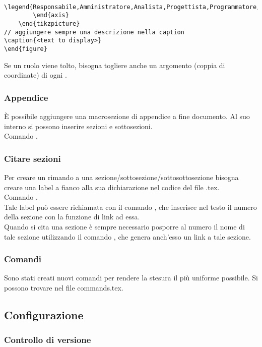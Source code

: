 \begin{itemize}
\begin{lstlisting}
			\legend{Responsabile,Amministratore,Analista,Progettista,Programmatore,Verificatore}
		\end{axis}
	\end{tikzpicture}
// aggiungere sempre una descrizione nella caption
\caption{<text to display>}
\end{figure}
		\end{lstlisting}
		Se un ruolo viene tolto, bisogna togliere anche un argomento (coppia di coordinate) di ogni .
	\end{itemize}

\subsubsection{Appendice} È possibile aggiungere una macrosezione di appendice a fine documento. Al suo interno si possono inserire sezioni e sottosezioni. \\Comando {}.

\subsubsection{Citare sezioni} \label{subsubsection:Citare_sezioni}
Per creare un rimando a una sezione/sottosezione/sottosottosezione bisogna creare una label a fianco alla sua dichiarazione nel codice del file .tex.\\
Comando .\\
Tale label può essere richiamata con il comando , che inserisce nel testo il numero della sezione con la funzione di link ad essa. \\
Quando si cita una sezione è sempre necessario posporre al numero il nome di tale sezione utilizzando il comando , che genera anch'esso un link a tale sezione.

\subsubsection{Comandi}
Sono stati creati nuovi comandi per rendere la stesura il più uniforme possibile. Si possono trovare nel file commands.tex.

\subsection{Configurazione}\label{subsection:configurazione}

\subsubsection{Controllo di versione}

